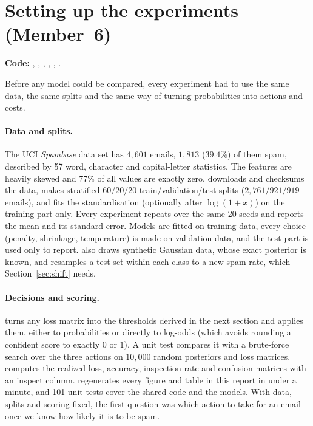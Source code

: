 \section{Setting up the experiments (Member~6)}
\label{sec:setup}
\textbf{Code:} , , , ,
, .

Before any model could be compared, every experiment had to use the same data, the same splits and
the same way of turning probabilities into actions and costs.

\paragraph{Data and splits.}
The UCI \emph{Spambase} data set has $4{,}601$ emails, $1{,}813$ ($39.4\%$) of them spam, described by
57 word, character and capital-letter statistics. The features are heavily skewed and $77\%$ of all
values are exactly zero.  downloads and checksums the data, makes stratified
$60/20/20$ train/validation/test splits ($2{,}761/921/919$ emails), and fits the standardisation
(optionally after $\log(1+x)$) on the training part only. Every experiment repeats over the same 20
seeds and reports the mean and its standard error. Models are fitted on training data, every
choice (penalty, shrinkage, temperature) is made on validation data, and the test part is used only
to report.  also draws synthetic Gaussian data, whose exact posterior is known, and
resamples a test set within each class to a new spam rate, which Section~\ref{sec:shift} needs.

\paragraph{Decisions and scoring.}
 turns any loss matrix into the thresholds derived in the next section and applies
them, either to probabilities or directly to log-odds (which avoids rounding a confident score to
exactly $0$ or $1$). A unit test compares it with a brute-force search over the three actions on
$10{,}000$ random posteriors and loss matrices.  computes the realized loss, accuracy,
inspection rate and confusion matrices with an inspect column.  regenerates every
figure and table in this report in under a minute, and 101 unit tests cover the shared code and the
models. With data, splits and scoring fixed, the first question was which action to take for an
email once we know how likely it is to be spam.
